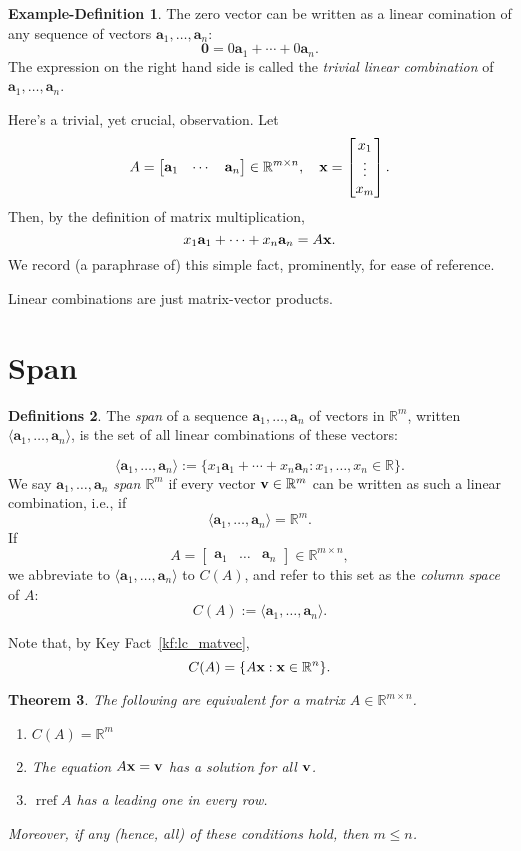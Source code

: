 \documentclass[12pt]{amsart}
\newcommand{\RR}{\mathbb{R}} \DeclareMathOperator{\rref}{rref}
\newtheorem{theorem}{Theorem}[section]
\theoremstyle{definition} \newtheorem{definition}[theorem]{Definition}
\newtheorem{definitions}[theorem]{Definitions}
\newtheorem{exdef}[theorem]{Example-Definition}
\newcommand{\ba}{\mathbf{a}} \newcommand{\bb}{\mathbf{b}}
\newcommand{\bzero}{\mathbf{0}}
\newcommand{\bas}{\ba_1,\ldots,\ba_n}
\newcommand{\mat}[1]{\begin{bmatrix}#1\end{bmatrix}}
\begin{document}
\begin{exdef}\label{exdef:trivial_lc} The zero vector can be written as a
	linear comination of any sequence of vectors $\bas$: \[ \bzero = 0\ba_1
	+ \cdots + 0\ba_n.  \] The expression on the right hand side is called
	the \emph{trivial linear combination} of $\bas$.  \end{exdef}

Here's a trivial, yet crucial, observation. Let \[
A=\mat{\ba_1&\cdots&\ba_n}\in\RR^{m\times n}, \quad \bx=\mat{x_1\\\vdots\\x_m}.
\] Then, by the definition of matrix multiplication, \[ x_1\ba_1+\cdots +
x_n\ba_n = A\bx.  \] We record (a paraphrase of) this simple fact, prominently,
for ease of reference.

\begin{keyfact}\label{kf:lc_matvec} Linear combinations are just matrix-vector
products.  \end{keyfact}


\section{Span}

\begin{definitions} The \emph{span} of a sequence $\bas$ of vectors in $\RR^m$,
	written $\langle \bas\rangle$, is the set of all linear combinations of
	these vectors:
	
	\[ \langle \bas \rangle := \{x_1\ba_1+\cdots + x_n\ba_n
		: x_1,\ldots,x_n\in\RR\}.  \] We say $\bas$ \emph{span $\RR^m$}
		if every vector $\bv\in\RR^m$ can be written as such a linear
		combination, i.e., if \[ \langle \ba_1,\ldots,\ba_n\rangle =
			\RR^m.  \] If \[
			A=\mat{\ba_1&\ldots&\ba_n}\in\RR^{m\times n}, \] we
		abbreviate to $\langle \ba_1,\ldots,\ba_n\rangle$ to $C(A)$,
	and refer to this set as the \emph{column space} of $A$: \[ C(A) :=
\langle \ba_1,\ldots,\ba_n\rangle.  \] \end{definitions}

Note that, by Key Fact~\ref{kf:lc_matvec}, \[ C(A) = \{A\bx : \bx\in\RR^n\}.
\] \begin{theorem} The following are equivalent for a matrix $A\in\RR^{m\times
n}$.  \begin{enumerate} \item $C(A) = \RR^m$ \item The equation $A\mathbf{x}=\mathbf{v}$ has
	a solution for all $\mathbf{v}$.  \item $\rref A$ has a leading one in every
	row.  \end{enumerate} Moreover, if any (hence, all) of these conditions
hold, then $m\leq n$.  \end{theorem}
\end{document}
